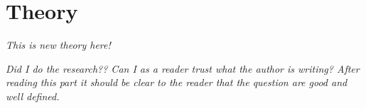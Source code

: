 \chapter{Theory}\label{cha:theory}

\textit{This is new theory here!}

\textit{Did I do the research?? Can I as a reader trust what the author is writing? After reading this part it should be clear to the reader that the question are good and well defined.}






